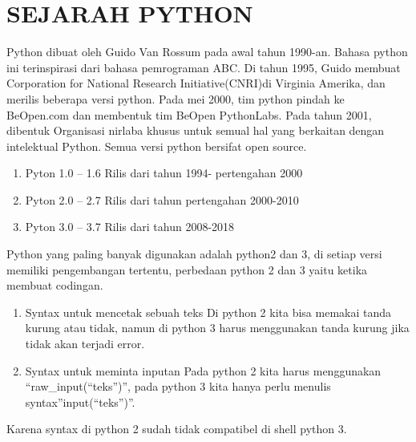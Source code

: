 \chapter*{SEJARAH PYTHON}

\par
	Python dibuat oleh Guido Van Rossum pada awal tahun 1990-an. Bahasa python ini terinspirasi dari bahasa pemrograman ABC. Di tahun 1995, Guido membuat Corporation for National Research Initiative(CNRI)di Virginia Amerika, dan merilis beberapa versi python. Pada mei 2000, tim python pindah ke BeOpen.com dan membentuk tim BeOpen PythonLabs. Pada tahun 2001, dibentuk Organisasi nirlaba khusus untuk semual hal yang berkaitan dengan intelektual Python. Semua versi python bersifat open source.
		
\begin{enumerate}
\item Pyton 1.0 – 1.6 Rilis dari tahun 1994- pertengahan 2000
\item Pyton 2.0 – 2.7 Rilis dari tahun pertengahan 2000-2010 
\item Pyton 3.0 – 3.7 Rilis dari tahun 2008-2018
\end{enumerate}

\par
	Python yang paling banyak digunakan adalah python2 dan 3, di setiap versi memiliki pengembangan tertentu, perbedaan python 2 dan 3 yaitu ketika membuat codingan.
	
	\begin{enumerate}
\item Syntax untuk mencetak sebuah teks Di python 2 kita bisa memakai tanda kurung atau tidak, namun di python 3 harus menggunakan tanda kurung jika tidak akan terjadi error.
\item Syntax untuk meminta inputan Pada python 2 kita harus menggunakan “raw\_input(“teks”)”, pada python 3 kita hanya perlu menulis syntax”input(“teks”)”.
	
	\end{enumerate}
\par	Karena syntax di python 2 sudah tidak compatibel di shell python 3. 
